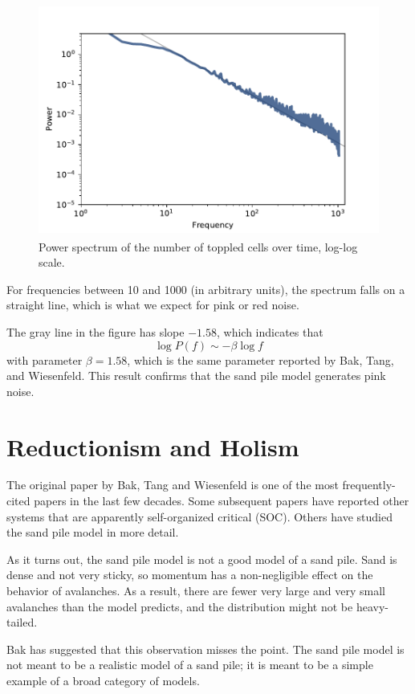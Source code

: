 \documentclass[12pt]{book}
\theoremstyle{exercise}
\begin{document}
\begin{figure}
\centerline{\includegraphics[height=3in]{figs/chap08-6.pdf}}
\caption{Power spectrum of the number of toppled cells over time, log-log scale.}
\label{chap08-6}
\end{figure}

For frequencies between
10 and 1000 (in arbitrary units), the spectrum falls on a straight
line, which is what we expect for pink or red noise.

The gray line in the figure has slope $-1.58$, which indicates that
%
\[ \log P(f) \sim -\beta \log f \]
%
with parameter $\beta=1.58$, which is the same parameter reported by Bak,
Tang, and Wiesenfeld.  This result confirms that the sand pile model generates pink noise.


\section{Reductionism and Holism}
\label{model2}

The original paper by Bak, Tang and Wiesenfeld is one of
the most frequently-cited papers in the last few decades.
Some subsequent papers have reported other systems that are apparently
self-organized critical (SOC).  Others have studied the sand pile model in
more detail.


As it turns out, the sand pile model is not a good model of a
sand pile.  Sand is dense and not very sticky, so momentum has a
non-negligible effect on the behavior of avalanches.  As a result,
there are fewer very large and very small avalanches than the model
predicts, and the distribution might not be heavy-tailed.

Bak has suggested that this observation misses the point.
The sand pile model is not meant to be a realistic model of a sand
pile; it is meant to be a simple example of a broad category of
models.
\end{document}
